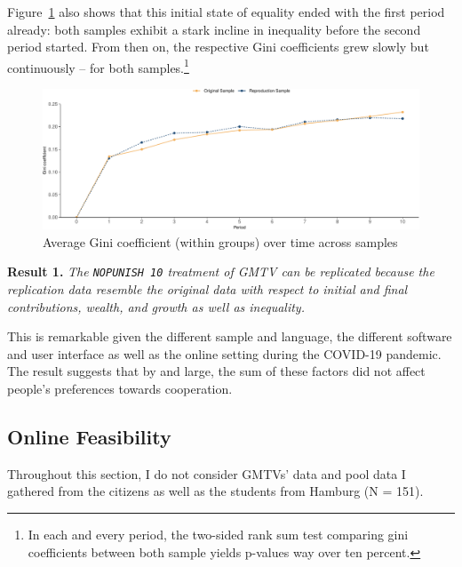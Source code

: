 \documentclass[
  authoryear,
  review,
  3p,
  onecolumn]{elsarticle}
\begin{document}
Figure~\ref{fig-gini-time-series} also shows that this initial state of
equality ended with the first period already: both samples exhibit a
stark incline in inequality before the second period started. From then
on, the respective Gini coefficients grew slowly but continuously -- for
both samples.\footnote{In each and every period, the two-sided rank sum
  test comparing gini coefficients between both sample yields p-values
  way over ten percent.}

\begin{figure}

{\centering \includegraphics{paper_files/figure-pdf/fig-gini-time-series-1.pdf}

}

\caption{\label{fig-gini-time-series}Average Gini coefficient (within
groups) over time across samples}

\end{figure}

\textbf{Result 1.} \emph{The \texttt{NOPUNISH\ 10} treatment of GMTV can
be replicated because the replication data resemble the original data
with respect to initial and final contributions, wealth, and growth as
well as inequality.}

This is remarkable given the different sample and language, the
different software and user interface as well as the online setting
during the COVID-19 pandemic. The result suggests that by and large, the
sum of these factors did not affect people's preferences towards
cooperation.

\hypertarget{sec-feasibility}{%
\subsection{Online Feasibility}\label{sec-feasibility}}

Throughout this section, I do not consider GMTVs' data and pool data I
gathered from the citizens as well as the students from Hamburg (N =
151).
\end{document}
